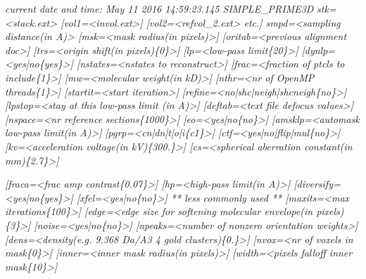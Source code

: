 \documentclass[review]{elsarticle}
\begin{document}
{{{\it{current date and time: May 11 2016 14:59:23.145 SIMPLE\_PRIME3D}}
{\it{stk=<stack.ext> [vol1=<invol.ext>] [vol2=<refvol\_2.ext> etc.] smpd=<sampling}}
{\it{distance(in A)> [msk=<mask radius(in pixels)>] [oritab=<previous alignment}}
{\it{doc>] [trs=<origin shift(in pixels)\{0\}>] [lp=<low-pass limit\{20\}>]}}
{\it{[dynlp=<yes|no\{yes\}>] [nstates=<nstates to reconstruct>] [frac=<fraction of}}
{\it{ptcls to include\{1\}>] [mw=<molecular weight(in kD)>] [nthr=<nr of OpenMP}}
{\it{threads\{1\}>] [startit=<start iteration>]}}
{\it{[refine=<no|shc|neigh|shcneigh\{no\}>] [lpstop=<stay at this low-pass limit (in}}
{\it{A)>] [deftab=<text file defocus values>] [nspace=<nr reference}}
{\it{sections\{1000\}>] [eo=<yes|no\{no\}>] [amsklp=<automask low-pass limit(in A)>]}}
{\it{[pgrp=<cn|dn|t|o|i\{c1\}>] [ctf=<yes|no|flip|mul\{no\}>] [kv=<acceleration}}
{\it{voltage(in kV)\{300.\}>] [cs=<spherical aberration constant(in mm)\{2.7\}>]}}}
{\it{[fraca=<frac amp contrast\{0.07\}>] [hp=<high-pass limit(in A)>]}
{\it{[diversify=<yes|no\{yes\}>] [xfel=<yes|no\{no\}>]}}
{\it{** less commonly used **}}
{\it{[maxits=<max iterations\{100\}>] [edge=<edge size for softening molecular}}
{\it{envelope(in pixels)\{3\}>] [noise=<yes|no\{no\}>] [npeaks=<number of nonzero}}
{\it{orientation weights>] [dens=<density(e.g. 9.368 Da/A3 4 gold clusters)\{0.\}>]}}
{\it{[nvox=<nr of voxels in mask\{0\}>] [inner=<inner mask radius(in pixels)>]}}
{\it{[width=<pixels falloff inner mask\{10\}>]}}

}}
\end{document}
